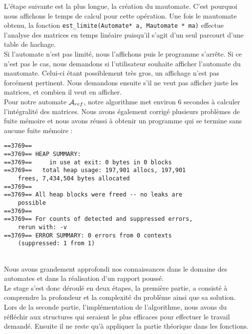\documentclass{report}
\begin{document}
L'étape suivante est la plus longue, la création du mautomate. C'est pourquoi nous affichons le temps de calcul pour cette opération. Une fois le mautomate obtenu, la fonction \verb?est_limite(Automate* a, Mautomate * ma)? effectue l'analyse des matrices en temps linéaire puisqu'il s'agit d'un seul parcourt d'une table de hachage.\\
Si l'automate n'est pas limité, nous l'affichons puis le programme s'arrête. Si ce n'est pas le cas, nous demandons si l'utilisateur souhaite afficher l'automate du mautomate. Celui-ci étant possiblement très gros, un affichage n'est pas forcément pertinent. Nous demandons ensuite s'il ne veut pas afficher juste les matrices, et combien il veut en afficher.\\

Pour notre automate $\mathcal{A}_{ref}$, notre algorithme met environ 6 secondes à calculer l'intégralité des matrices. Nous avons également corrigé plusieurs problèmes de fuite mémoire et nous avons réussi à obtenir un programme qui se termine sans aucune fuite mémoire :\\

\begin{lstlisting}[frame=single]
==3769== 
==3769== HEAP SUMMARY:
==3769==     in use at exit: 0 bytes in 0 blocks
==3769==   total heap usage: 197,901 allocs, 197,901 
	frees, 7,434,504 bytes allocated
==3769== 
==3769== All heap blocks were freed -- no leaks are 
	possible
==3769== 
==3769== For counts of detected and suppressed errors, 
	rerun with: -v
==3769== ERROR SUMMARY: 0 errors from 0 contexts 
	(suppressed: 1 from 1)
\end{lstlisting}
$ $\\\\

Nous avons grandement approfondi nos connaissances dans le domaine des automates et dans la réalisation d'un rapport poussé.\\
Le stage s'est donc déroulé en deux étapes, la première partie, a consisté à comprendre la profondeur et la complexité du problème ainsi que sa solution. Lors de la seconde partie, l'implémentation de l'algorithme, nous avons du réfléchir aux structures qui seraient le plus efficaces pour effectuer le travail demandé. Ensuite il ne reste qu'à appliquer la partie théorique dans les fonctions.\\



\end{document}
